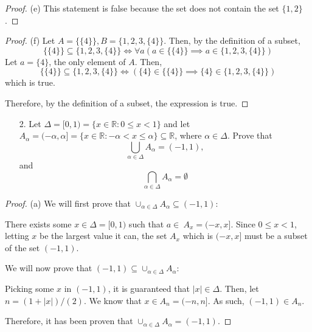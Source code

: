 \documentclass[10pt]{article}
\theoremstyle{definition}
\theoremstyle{plain}
\newcommand{\R}{\mathbb{R}}
\begin{document}
\begin{proof}{(e)}
  This statement is false because the set does not contain the set $\{1,2\}$.
\end{proof}

\begin{proof}{(f)}
  Let $A=\{\{4\}\}, B = \{1,2,3,\{4\}\}$. Then, by the definition of a subset,
  \begin{equation*}
    \{\{4\}\} \subseteq \{1,2,3,\{4\}\} \iff \forall a(a\in \{\{4\}\} \implies a\in \{1,2,3,\{4\}\})
  \end{equation*}
  Let $a=\{4\}$, the only element of $A$. Then,
  \begin{equation*}
      \{\{4\}\} \subseteq \{1,2,3,\{4\}\} \iff (\{4\}\in \{\{4\}\} \implies \{4\}\in \{1,2,3,\{4\}\})
  \end{equation*}
  which is true. \\

  \par Therefore, by the definition of a subset, the expression is true.
\end{proof}



\pagebreak



\begin{enumerate}
  \item[2.] Let $\Delta = [0,1) = \{x \in \R: 0 \leq x < 1\}$ and let $A_\alpha = (-\alpha,\alpha] = \{x \in \R: -\alpha < x \leq \alpha\} \subseteq \R$, where $\alpha \in \Delta$.  Prove that
      $$\bigcup_{\alpha \in \Delta} A_\alpha = (-1,1),$$
   and
      $$\bigcap_{\alpha \in \Delta} A_\alpha = \emptyset$$
\end{enumerate}

\begin{proof}{(a)}
  We will first prove that $\cup_{\alpha \in \Delta} A_\alpha \subseteq (-1,1)$: \\

  \par There exists some $x\in\Delta = [0,1)$ such that $a\in\ A_x=(-x,x]$. Since $0 \leq x<1$, letting $x$ be the largest value it can, the set $A_x$ which is $(-x,x]$ must be a subset of the set $(-1,1)$. \\

  \par We will now prove that $(-1,1) \subseteq \cup_{\alpha \in \Delta} A_\alpha$: \\

  \par Picking some $x$ in $(-1,1)$, it is guaranteed that $|x|\in\Delta$. Then, let $n=(1+|x|)/(2)$. We know that $x\in A_n = (-n, n]$. As such, $(-1,1)\in A_n$. \\

  \par Therefore, it has been proven that $\cup_{\alpha \in \Delta} A_\alpha = (-1,1)$.
\end{proof}
\end{document}

